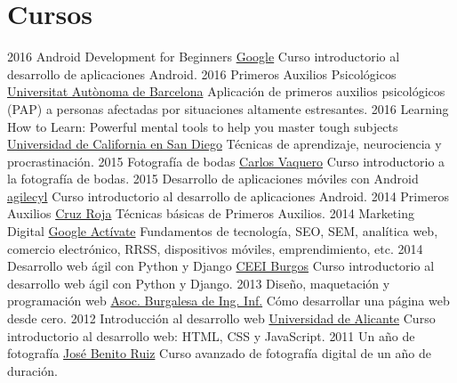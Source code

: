 \documentclass[]{friggeri-cv}
\begin{document}
\section{Cursos}
\begin{entrylist}
  \entry
    {2016}
    {Android Development for Beginners}
    {\href{https://www.udacity.com/course/android-development-for-beginners--ud837}{Google}}
    {Curso introductorio al desarrollo de aplicaciones Android.}
  \entry
    {2016}
    {Primeros Auxilios Psicológicos}
    {\href{https://www.coursera.org/learn/pap}{Universitat Autònoma de Barcelona}}
    {Aplicación de primeros auxilios psicológicos (PAP) a personas afectadas por situaciones altamente estresantes.}
  \entry
    {2016}
    {Learning How to Learn: Powerful mental tools to help you master tough subjects}
    {\href{https://coursera.org/learn/learning-how-to-learn/}{Universidad de California en San Diego}}
    {Técnicas de aprendizaje, neurociencia y procrastinación.}
  \entry
    {2015}
    {Fotografía de bodas}
    {\href{http://www.carlosvaquero.es/}{Carlos Vaquero}}
    {Curso introductorio a la fotografía de bodas.}
  \entry
    {2015}
    {Desarrollo de aplicaciones móviles con Android}
    {\href{http://agilecyl.org/}{agilecyl}}
    {Curso introductorio al desarrollo de aplicaciones Android.}
  \entry
    {2014}
    {Primeros Auxilios}
    {\href{http://www.cruzroja.es/}{Cruz Roja}}
    {Técnicas básicas de Primeros Auxilios.}
  \entry
    {2014}
    {Marketing Digital}
    {\href{https://www.google.es/landing/activate/}{Google Actívate}} 
    {Fundamentos de tecnología, SEO, SEM, analítica web, comercio electrónico, RRSS, dispositivos móviles, emprendimiento, etc.}
  \entry
    {2014}
    {Desarrollo web ágil con Python y Django}
    {\href{http://www.ceeiburgos.es/}{CEEI Burgos}} 
    {Curso introductorio al desarrollo web ágil con Python y Django.}    
  \entry
    {2013}
    {Diseño, maquetación y programación web}
    {\href{http://abi2burgos.es/}{Asoc. Burgalesa de Ing. Inf.}}   
    {Cómo desarrollar una página web desde cero.}     
  \entry
    {2012}
    {Introducción al desarrollo web}
    {\href{https://www.ua.es/}{Universidad de Alicante}}  
    {Curso introductorio al desarrollo web: HTML, CSS y JavaScript.}     
  \entry
    {2011}
    {Un año de fotografía}
    {\href{http://josebruiz.com/}{José Benito Ruiz}}    
    {Curso avanzado de fotografía digital de un año de duración.}      
\end{entrylist}
\end{document}
